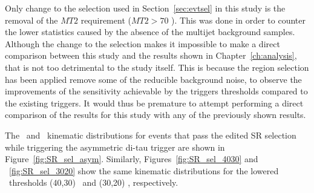  	 Only change to the selection used in Section~\ref{sec:evtsel} in this study is the removal of the $MT2$ requirement ($MT2>70$ \gev). This was done in order to counter the lower statistics caused by the absence of the multijet background samples. 
 	 Although the change to the selection makes it impossible to make a direct comparison between this study and the results shown in Chapter~\ref{ch:analysis}, that is not too detrimental to the study itself. This is because the region selection has been applied remove some of the reducible background noise, to observe the improvements of the sensitivity achievable by the triggers thresholds compared to the existing triggers.
 	  It would thus be premature to attempt performing a direct comparison of the results for this study with any of the previously shown results. 
 	 
 	 The \met\ and \ltau\ kinematic distributions for events that pass the edited \ac{SR} selection while triggering the asymmetric di-tau trigger are shown in Figure~\ref{fig:SR_sel_asym}. Similarly,  Figures~\ref{fig:SR_sel_4030} and ~\ref{fig:SR_sel_3020} show the same kinematic distributions for the lowered \pt\ thresholds (40,30) \gev\ and (30,20) \gev, respectively.
 	 \SRAsymmetricTrigger
 	
	\SRFTTrigger
	
